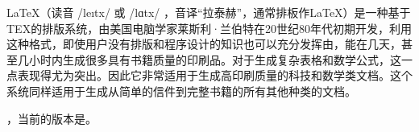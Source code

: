 
 LaTeX（读音 {\times/\textprimstress le\i t\textepsilon x/} 或 {\times/\textprimstress lɑ\textlengthmark t\textepsilon x/ }，音译“拉泰赫”，通常排板作\LaTeX）是一种基于TEX的排版系统，由美国电脑学家莱斯利·兰伯特在20世纪80年代初期开发，利用这种格式，即使用户没有排版和程序设计的知识也可以充分发挥由，能在几天，甚至几小时内生成很多具有书籍质量的印刷品。对于生成复杂表格和数学公式，这一点表现得尤为突出。因此它非常适用于生成高印刷质量的科技和数学类文档。这个系统同样适用于生成从简单的信件到完整书籍的所有其他种类的文档。

，当前的版本是\LaTeXe。

\newcommand{\guanjianci}{\LaTeX}
